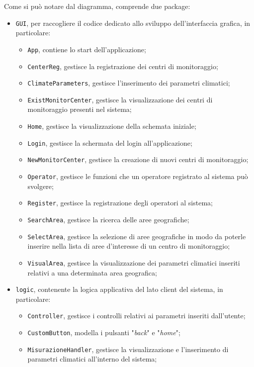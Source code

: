\pagebreak
Come si può notare dal diagramma, comprende due package:
\begin{itemize}
	\item \texttt{GUI}, per raccogliere il codice dedicato allo sviluppo dell'interfaccia grafica, in particolare:
	\begin{itemize}
		\item \texttt{App}, contiene lo start dell'applicazione;
		\item \texttt{CenterReg}, gestisce la registrazione dei centri di monitoraggio;
		\item \texttt{ClimateParameters}, gestisce l'inserimento dei parametri climatici;
		\item \texttt{ExistMonitorCenter}, gestisce la visualizzazione dei centri di monitoraggio presenti nel sistema;
		\item \texttt{Home}, gestisce la visualizzazione della schemata iniziale;
		\item \texttt{Login}, gestisce la schermata del login all'applicazione;
		\item \texttt{NewMonitorCenter}, gestisce la creazione di nuovi centri di monitoraggio;
		\item \texttt{Operator}, gestisce le funzioni che un operatore registrato al sistema può svolgere;
		\item \texttt{Register}, gestisce la registrazione degli operatori al sistema;
		\item \texttt{SearchArea}, gestisce la ricerca delle aree geografiche;
		\item \texttt{SelectArea}, gestisce la selezione di aree geografiche in modo da poterle inserire nella lista di aree d'interesse di un centro di monitoraggio;
		\item \texttt{VisualArea}, gestisce la visualizzazione dei parametri climatici inseriti relativi a una determinata area geografica;
	\end{itemize}
	\item \texttt{logic}, contenente la logica applicativa del lato client del sistema, in particolare:
	\begin{itemize}
		\item \texttt{Controller}, gestisce i controlli relativi ai parametri inseriti dall'utente;
		\item \texttt{CustomButton}, modella i pulsanti "\textit{back}" e "\textit{home}";
		\item \texttt{MisurazioneHandler}, gestisce la visualizzazione e l'inserimento di parametri climatici all'interno del sistema;

\end{itemize}
\end{itemize}
